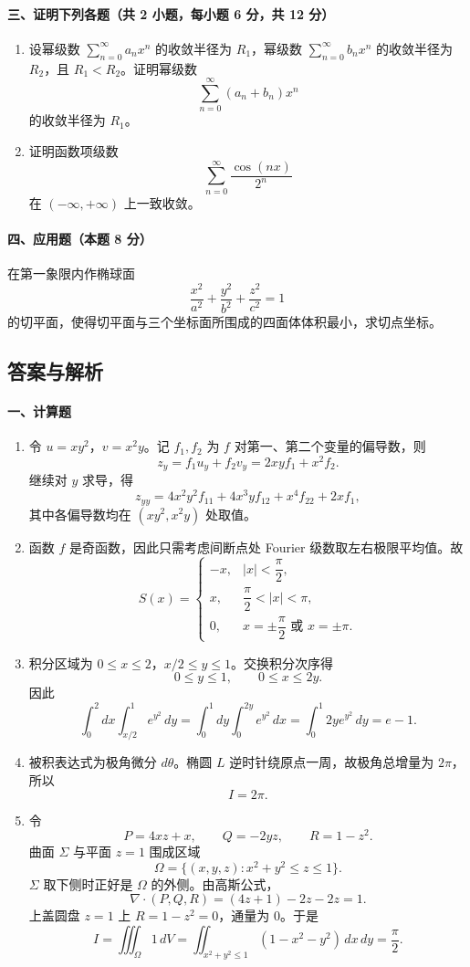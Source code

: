 \paragraph*{三、证明下列各题（共 2 小题，每小题 6 分，共 12 分）}
\begin{enumerate}
  \item 设幂级数 $\sum_{n=0}^\infty a_nx^n$ 的收敛半径为 $R_1$，幂级数 $\sum_{n=0}^\infty b_nx^n$ 的收敛半径为 $R_2$，且 $R_1<R_2$。证明幂级数
  \[
    \sum_{n=0}^\infty (a_n+b_n)x^n
  \]
  的收敛半径为 $R_1$。
  \item 证明函数项级数
  \[
    \sum_{n=0}^\infty \frac{\cos(nx)}{2^n}
  \]
  在 $(-\infty,+\infty)$ 上一致收敛。
\end{enumerate}

\paragraph*{四、应用题（本题 8 分）}
在第一象限内作椭球面
\[
  \frac{x^2}{a^2}+\frac{y^2}{b^2}+\frac{z^2}{c^2}=1
\]
的切平面，使得切平面与三个坐标面所围成的四面体体积最小，求切点坐标。

\subsection{答案与解析}

\paragraph*{一、计算题}
\begin{enumerate}
  \item 令 $u=xy^2$，$v=x^2y$。记 $f_1,f_2$ 为 $f$ 对第一、第二个变量的偏导数，则
  \[
    z_y=f_1u_y+f_2v_y=2xyf_1+x^2f_2.
  \]
  继续对 $y$ 求导，得
  \[
    z_{yy}=4x^2y^2f_{11}+4x^3yf_{12}+x^4f_{22}+2xf_1,
  \]
  其中各偏导数均在 $(xy^2,x^2y)$ 处取值。
  \item 函数 $f$ 是奇函数，因此只需考虑间断点处 Fourier 级数取左右极限平均值。故
  \[
    S(x)=
    \begin{cases}
      -x, & |x|<\dfrac{\pi}{2},\\
      x, & \dfrac{\pi}{2}<|x|<\pi,\\
      0, & x=\pm\dfrac{\pi}{2}\text{ 或 }x=\pm\pi.
    \end{cases}
  \]
  \item 积分区域为 $0\le x\le 2$，$x/2\le y\le 1$。交换积分次序得
  \[
    0\le y\le 1,\qquad 0\le x\le 2y.
  \]
  因此
  \[
    \int_0^2 dx\int_{x/2}^1 e^{y^2}\,dy
    =\int_0^1dy\int_0^{2y}e^{y^2}\,dx
    =\int_0^1 2y e^{y^2}\,dy=e-1.
  \]
  \item 被积表达式为极角微分 $d\theta$。椭圆 $L$ 逆时针绕原点一周，故极角总增量为 $2\pi$，所以
  \[
    I=2\pi.
  \]
  \item 令
  \[
    P=4xz+x,\qquad Q=-2yz,\qquad R=1-z^2.
  \]
  曲面 $\Sigma$ 与平面 $z=1$ 围成区域
  \[
    \Omega=\{(x,y,z):x^2+y^2\le z\le 1\}.
  \]
  $\Sigma$ 取下侧时正好是 $\Omega$ 的外侧。由高斯公式，
  \[
    \nabla\cdot(P,Q,R)=(4z+1)-2z-2z=1.
  \]
  上盖圆盘 $z=1$ 上 $R=1-z^2=0$，通量为 $0$。于是
  \[
    I=\iiint_\Omega 1\,dV
    =\iint_{x^2+y^2\le 1}(1-x^2-y^2)\,dx\,dy
    =\frac{\pi}{2}.
  \]
\end{enumerate}

